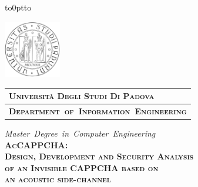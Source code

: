 \begin{titlepage} %
\begin{center}
\vbox to0pt{\vbox to\vss}

\begin{minipage}{.2\textwidth}
  \includegraphics[height=2.5cm]{./Images/unipd-bn}
\end{minipage}\begin{minipage}{.80\textwidth}
  \begin{table}[H]
  \begin{tabular}{l}
  \scshape{\bfseries{\large{Università Degli Studi Di Padova}}} \\
  \hline
  \scshape{\bfseries{Department~of~Information~Engineering}}\\
  \end{tabular}
  \end{table}
\end{minipage}

\vspace{1cm}
\Large{\textit{\textit{Master~Degree~in~Computer~Engineering}}} \\
\vspace{1.5cm}
\scshape{\Large{\bfseries{AcCAPPCHA:\\}}}
\scshape{\large{\bfseries{Design, Development and Security Analysis\\}}}
\scshape{\large{\bfseries{of an Invisible CAPPCHA based on\\}}}
\scshape{\large{\bfseries{an acoustic side-channel\\}}}
\vspace{0.2cm} \linespread{1} 
\scshape{\large{\bfseries{}}}
\end{center}


\end{titlepage}

